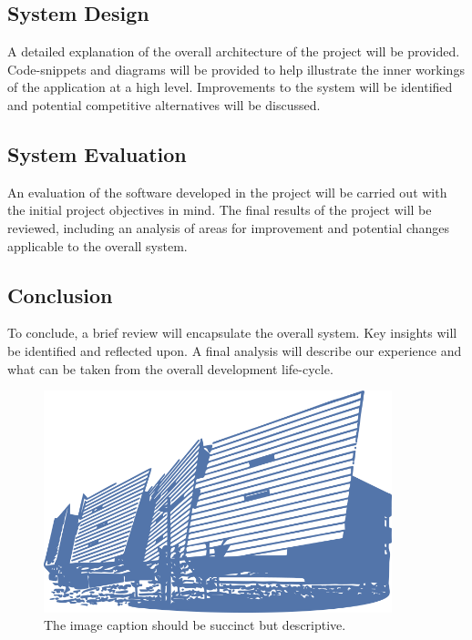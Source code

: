 \subsection{System Design}
A detailed explanation of the overall architecture of the project will be provided. Code-snippets and diagrams will be provided to help illustrate the inner workings of the application at a high level. Improvements to the system will be identified and potential competitive alternatives will be discussed.
\subsection{System Evaluation}
An evaluation of the software developed in the project will be carried out with the initial project objectives in mind. The final results of the project will be reviewed, including an analysis of areas for improvement and potential changes applicable to the overall system.
\subsection{Conclusion}
To conclude, a brief review will encapsulate the overall system. Key insights will be identified and reflected upon. A final analysis will describe our experience and what can be taken from the overall development life-cycle.

\begin{figure}[h!]
	\caption{The image caption should be succinct but descriptive.}
	\label{image:myImageName}
	\centering
	\includegraphics[width=0.9\textwidth]{images/gmit-building.png}
\end{figure}	